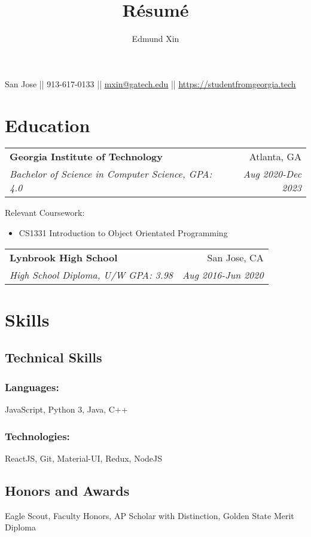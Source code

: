 \documentclass[letterpaper,8pt]{article}
\makeatletter
\renewcommand{\maketitle}{
  \begin{center}
  {\huge\bfseries
  \theauthor}

  \vspace{0.25em}

  San Jose || 913-617-0133 || \href{mailto:mxin@gatech.edu}{mxin@gatech.edu} || \href{https://studentfromgeorgia.tech}{https://studentfromgeorgia.tech}

  \end{center}
}
\newcommand{\resumeSubheading}[4]{
  \vspace{0.25em}
  \begin{tabular*}{1\textwidth}[t]{l@{\extracolsep{\fill}}r}
    \textbf{#1} & #2 \\
    \textit{#3} & \textit{#4} \\
  \end{tabular*}\vspace{-5pt}
}
\makeatother
\begin{document}
\title{R\'esum\'e}
\author{Edmund Xin}

\maketitle

\section{Education}

\resumeSubheading{Georgia Institute of Technology}
{Atlanta, GA}{Bachelor of Science in Computer Science, GPA: 4.0
}{Aug 2020-Dec 2023}

Relevant Coursework:

\begin{itemize}[label=\raisebox{0.25ex}{\tiny$\bullet$}]
  \item CS1331 Introduction to Object Orientated Programming
\end{itemize}
\vspace{5pt}


\resumeSubheading{Lynbrook High School}
{San Jose, CA}{High School Diploma, U/W GPA: 3.98}{Aug 2016-Jun 2020}

\section{Skills}

\begin{multicols}{2}
\subsection{Technical Skills}

\subsubsection{Languages:}

JavaScript, Python 3, Java, C++

\subsubsection{Technologies:}

ReactJS, Git, Material-UI, Redux, NodeJS

\columnbreak


\subsection{Honors and Awards}
Eagle Scout, Faculty Honors, AP Scholar with Distinction, Golden State Merit Diploma

\end{multicols}
\end{document}
